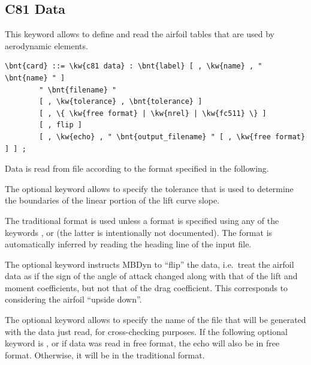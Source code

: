 \subsection{C81 Data}\label{sec:C81-DATA}
This keyword allows to define and read the  
airfoil tables that are used by aerodynamic elements.
\begin{Verbatim}[commandchars=\\\{\}]
    \bnt{card} ::= \kw{c81 data} : \bnt{label} [ , \kw{name} , " \bnt{name} " ]
        " \bnt{filename} "
        [ , \kw{tolerance} , \bnt{tolerance} ]
        [ , \{ \kw{free format} | \kw{nrel} | \kw{fc511} \} ]
        [ , flip ]
        [ , \kw{echo} , " \bnt{output_filename} " [ , \kw{free format} ] ] ;
\end{Verbatim}
Data is read from file  according to the format specified
in the following.

The optional keyword  allows to specify the tolerance
that is used to determine the boundaries of the linear portion
of the lift curve slope.

The traditional format is used unless a format is specified using any
of the keywords ,  or 
(the latter is intentionally not documented).
The format is automatically inferred by reading the heading line
of the input file.

The optional keyword  instructs MBDyn to ``flip'' the data,
i.e.\ treat the airfoil data as if the sign of the angle of attack
changed along with that of the lift and moment coefficients,
but not that of the drag coefficient.
This corresponds to considering the airfoil ``upside down''.

The optional keyword  allows to specify the name of the file
that will be generated with the data just read, for cross-checking purposes.
If the following optional keyword is , or if data was read
in free format, the echo will also be in free format.
Otherwise, it will be in the traditional format.

